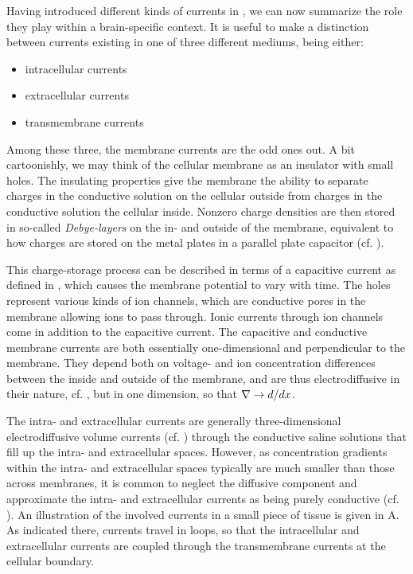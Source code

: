 Having introduced different kinds of currents in , we can now summarize the role they play within a brain-specific context. It is useful to make a distinction between currents existing in one of three different mediums, being either:
\begin{itemize}
\item intracellular currents 
\item extracellular currents 
\item transmembrane currents  
\end{itemize}

Among these three, the membrane currents are the odd ones out. A bit cartoonishly, we may think of the cellular membrane as an insulator with small holes. The insulating properties give the membrane the ability to separate charges in the conductive solution on the cellular outside from charges in the conductive solution the cellular inside. Nonzero charge densities are then stored in so-called \textit{Debye-layers} on the in- and outside of the membrane, equivalent to how charges are stored on the metal plates in a parallel plate capacitor (cf. ). 

This charge-storage process can be described in terms of a capacitive current as defined in , which causes the membrane potential to vary with time. The holes represent various kinds of ion channels, which are conductive pores in the membrane allowing ions to pass through. Ionic currents through ion channels come in addition to the capacitive current. The capacitive and conductive membrane currents are both essentially one-dimensional and perpendicular to the membrane. They depend both on voltage- and ion concentration differences between the inside and outside of the membrane, and are thus electrodiffusive in their nature, cf. , but in one dimension, so that ${\bf \nabla} \rightarrow d/dx$.

The intra- and extracellular currents are generally three-dimensional electrodiffusive volume currents (cf. ) through the conductive saline solutions that fill up the intra- and extracellular spaces. However, as concentration gradients within the intra- and extracellular spaces typically are much smaller than those across membranes, it is common to neglect the diffusive component and approximate the intra- and extracellular currents as being purely conductive (cf. ). An illustration of the involved currents in a small piece of tissue is given in A. As indicated there, currents travel in loops, so that the intracellular and extracellular currents are coupled through the transmembrane currents at the cellular boundary. 

